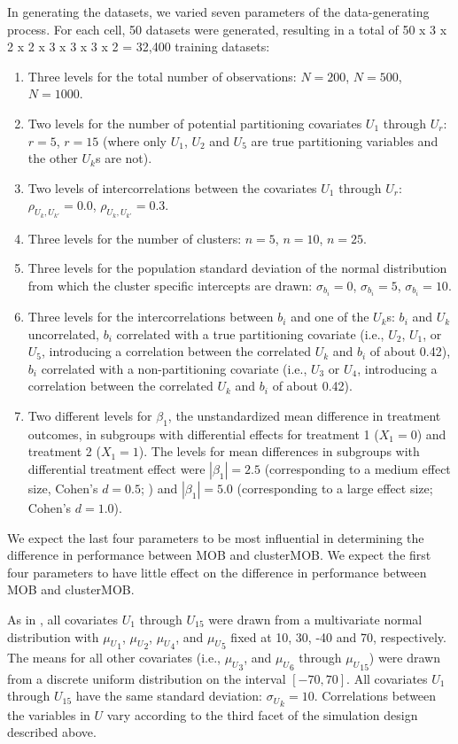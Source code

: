 \documentclass[nobf,man]{apa}
\begin{document}
In generating the datasets, we varied seven parameters of the data-generating process. For each cell, 50 datasets were generated, resulting in a total of 50 x 3 x 2 x 2 x 3 x 3 x 3 x 2 = 32,400 training datasets:

\begin{enumerate}
\item Three levels for the total number of observations: $N=200$, $N=500$, $N=1000$.
\item Two levels for the number of potential partitioning covariates $U_1$ through $U_r$: $r=5$, $r=15$ (where only $U_1$, $U_2$ and $U_5$ are true partitioning variables and the other $U_k$s are not).
\item Two levels of intercorrelations between the covariates $U_1$ through $U_r$: $\rho_{U_{k},U_{k'}}=0.0$, $\rho_{U_{k},U_{k'}}=0.3$.
\item Three levels for the number of clusters: $n=5$, $n=10$, $n=25$.
\item Three levels for the population standard deviation of the normal distribution from which the cluster specific intercepts are drawn: $\sigma_{b_i}=0$, $\sigma_{b_i}=5$, $\sigma_{b_i}=10$.
\item Three levels for the intercorrelations between $b_i$ and one of the $U_k$s: $b_i$ and $U_k$ uncorrelated, $b_i$ correlated with a true partitioning covariate (i.e., $U_2$, $U_1$, or $U_5$, introducing a correlation between the correlated $U_k$ and $b_i$ of about 0.42), $b_i$ correlated with a non-partitioning covariate (i.e., $U_3$ or $U_4$, introducing a correlation between the correlated $U_k$ and $b_i$ of about 0.42). 
\item Two different levels for $\beta_1$, the unstandardized mean difference in treatment outcomes, in subgroups with differential effects for treatment 1 ($X_{1}=0$) and treatment 2 ($X_{1}=1$). The levels for mean differences in subgroups with differential treatment effect were $|\beta_1| = 2.5$ (corresponding to a medium effect size, Cohen's $d = 0.5$; ) and $|\beta_1| = 5.0$ (corresponding to a large effect size; Cohen's $d = 1.0$).
\end{enumerate}

We expect the last four parameters to be most influential in determining the difference in performance between MOB and clusterMOB. We expect the first four parameters to have little effect on the difference in performance between MOB and clusterMOB.

As in , all covariates $U_1$ through $U_{15}$ were drawn from a multivariate normal distribution with ${\mu_U}_1$, ${\mu_U}_2$, ${\mu_U}_4$, and ${\mu_U}_5$ fixed at 10, 30, -40 and 70, respectively. The means for all other covariates (i.e., ${\mu_U}_3$, and ${\mu_U}_6$ through ${\mu_U}_{15}$) were drawn from a discrete uniform distribution on the interval $[-70,70]$. All covariates $U_1$ through $U_{15}$ have the same standard deviation: ${\sigma_U}_k = 10$. Correlations between the variables in $U$ vary according to the third facet of the simulation design described above.
\end{document}

